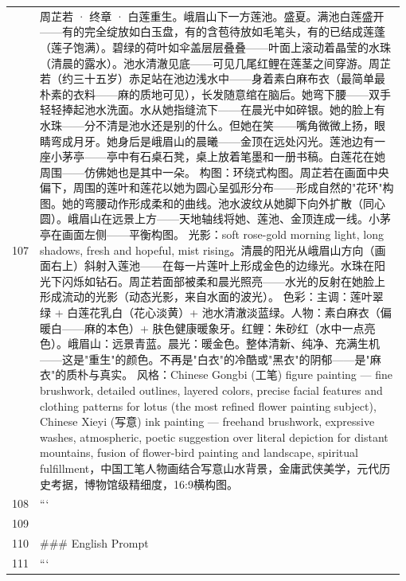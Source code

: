 \begin{longtable}{@{}>{\RaggedLeft\arraybackslash\footnotesize}p{0.04\linewidth}@{\hspace{0.8em}}>{\RaggedRight\arraybackslash\ttfamily\scriptsize}p{0.935\linewidth}@{}}
107 & 周芷若 · 终章 · 白莲重生。峨眉山下一方莲池。盛夏。满池白莲盛开——有的完全绽放如白玉盘，有的含苞待放如毛笔头，有的已结成莲蓬（莲子饱满）。碧绿的荷叶如伞盖层层叠叠——叶面上滚动着晶莹的水珠（清晨的露水）。池水清澈见底——可见几尾红鲤在莲茎之间穿游。周芷若（约三十五岁）赤足站在池边浅水中——身着素白麻布衣（最简单最朴素的衣料——麻的质地可见），长发随意绾在脑后。她弯下腰——双手轻轻捧起池水洗面。水从她指缝流下——在晨光中如碎银。她的脸上有水珠——分不清是池水还是别的什么。但她在笑——嘴角微微上扬，眼睛弯成月牙。她身后是峨眉山的晨曦——金顶在远处闪光。莲池边有一座小茅亭——亭中有石桌石凳，桌上放着笔墨和一册书稿。白莲花在她周围——仿佛她也是其中一朵。 构图：环绕式构图。周芷若在画面中央偏下，周围的莲叶和莲花以她为圆心呈弧形分布——形成自然的"花环"构图。她的弯腰动作形成柔和的曲线。池水波纹从她脚下向外扩散（同心圆）。峨眉山在远景上方——天地轴线将她、莲池、金顶连成一线。小茅亭在画面左侧——平衡构图。 光影：soft rose-gold morning light, long shadows, fresh and hopeful, mist rising。清晨的阳光从峨眉山方向（画面右上）斜射入莲池——在每一片莲叶上形成金色的边缘光。水珠在阳光下闪烁如钻石。周芷若面部被柔和晨光照亮——水光的反射在她脸上形成流动的光影（动态光影，来自水面的波光）。 色彩：主调：莲叶翠绿 + 白莲花乳白（花心淡黄）+ 池水清澈淡蓝绿。人物：素白麻衣（偏暖白——麻的本色）+ 肤色健康暖象牙。红鲤：朱砂红（水中一点亮色）。峨眉山：远景青蓝。晨光：暖金色。整体清新、纯净、充满生机——这是"重生"的颜色。不再是"白衣"的冷酷或"黑衣"的阴郁——是"麻衣"的质朴与真实。 风格：Chinese Gongbi (工笔) figure painting — fine brushwork, detailed outlines, layered colors, precise facial features and clothing patterns for lotus (the most refined flower painting subject), Chinese Xieyi (写意) ink painting — freehand brushwork, expressive washes, atmospheric, poetic suggestion over literal depiction for distant mountains, fusion of flower-bird painting and landscape, spiritual fulfillment，中国工笔人物画结合写意山水背景，金庸武侠美学，元代历史考据，博物馆级精细度，16:9横构图。\\
108 & ```\\
109 & \mbox{}\\
110 & \#\#\# English Prompt\\
111 & ```\\

\end{longtable}
